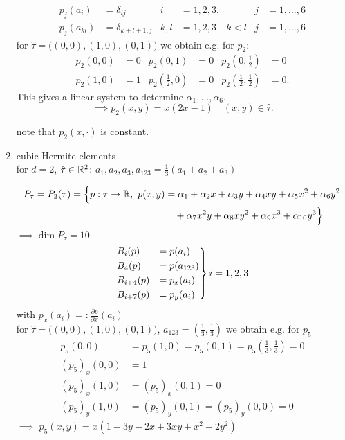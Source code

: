 \begin{example}
\begin{enumerate}[label=(\roman*)]
\begin{align*}
			p_j(a_i) &= \delta_{ij} &  i &=1,2,3, &  j&= 1,\dots,6\\
			p_j(a_{kl}) &= \delta_{k+l+1,j} &  k,l&=1,2,3\quad k<l &  j&=1,\dots,6 
		\end{align*}
		for $\hat{\tau} = \Big ( (0,0),(1,0),(0,1) \Big )$ we obtain e.g. for $p_2$:
		\begin{align*}
			p_2(0,0) &= 0 &  p_2(0,1) &= 0 &  p_2(0,\frac{1}{2})&= 0\\
			p_2(1,0) &= 1 &  p_2(\frac{1}{2},0) &= 0 &  p_2(\frac{1}{2},\frac{1}{2})&= 0.
		\end{align*}
		This gives a linear system to determine $\alpha_1,\dots,\alpha_6$.
		\begin{equation*}
			\implies p_2(x,y) = x(2x-1) \quad (x,y)\in \hat{\tau}.
		\end{equation*}
		
		note that $p_2(x,\cdot)$ is constant. 
		\item cubic Hermite elements\\
		for \underline{$d=2$}, $\hat{\tau} \in \mathbb{R}^2$: $a_1,a_2,a_3, a_{123} = \frac{1}{3}(a_1+a_2+a_3)$
		
		\begin{align*}
		P_{\tau} = P_2(\tau) = \Big\{ p:\tau \to \mathbb{R},\ p(x,y) &= \alpha_1 + \alpha_2 x + \alpha_3 y + \alpha_4 xy + \alpha_5 x^2 + \alpha_6 y^2 
		\\&\quad + \alpha_7x^2y +\alpha_8xy^2 +\alpha_9x^3 + \alpha_{10}y^3\Big\}
		\end{align*}
		$\implies \dim P_{\tau}= 10$
		\begin{equation*}
			\begin{rcases}
			B_i(p) &= p(a_i)\\
			B_4(p) &= p(a_{123})\\
			B_{i+4}(p) &= p_x(a_i)\\
			B_{i+7}(p) &= p_y(a_i)
			\end{rcases}
			i = 1,2,3
		\end{equation*}
		with $ p_x(a_i) =: \frac{\partial p}{\partial x}(a_i) $\\
		for $\hat{\tau} = \Big ( (0,0),(1,0),(0,1) \Big )$, $a_{123} = (\frac{1}{3},\frac{1}{3})$ we obtain e.g. for $p_5$ 
		\begin{align*}
			p_5(0,0) &= p_5(1,0) = p_5(0,1) = p_5(\frac{1}{3},\frac{1}{3}) = 0\\
			(p_5)_x(0,0) &= 1\\
			(p_5)_x(1,0) &= (p_5)_x(0,1) = 0\\
			(p_5)_y(1,0) &= (p_5)_y(0,1) = (p_5)_y(0,0) = 0
		\end{align*}
		$\implies$ $p_5(x,y) = x \left( 1 -3y -2x +3xy +x^2+2y^2 \right)$
	\end{enumerate}
\end{example}
